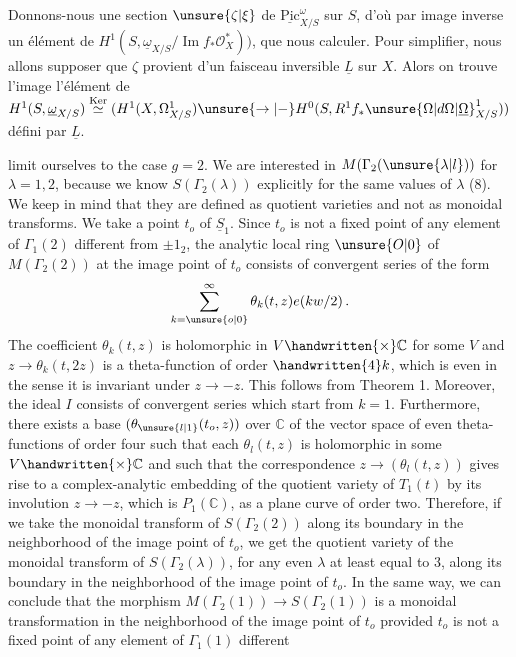 Donnons-nous une section  $\unsure{\zeta|\xi}$ de $\underline{\mathrm{Pic}}_{X/S}^{\omega}$ sur $S$, d'où par image inverse un élément de $H^{1}(S,\underline{\omega}_{X/S}/\operatorname{Im}f_{*}\mathcal{O}_{X}^{*}))$, que nous  calculer. Pour simplifier, nous allons supposer que $\zeta$ provient d'un faisceau inversible $\underline{L}$ sur $X$. Alors on trouve l'image  l'élément de $H^{1}(S,\underline{\omega}_{X/S})\overset{\mathrm{Ker}}{\simeq}(H^{1}(X,\Omega^{1}_{X/S})\unsure{\to|-}H^{0}(S,R^{1}f_{*}\unsure{\Omega|d\Omega|\underline{\Omega}}^{1}_{X/S}))$ défini par $\underline{L}$.



limit ourselves to the case $g=2$. We are interested in $M(\Gamma_{2}(\unsure{\lambda|l}))$ for $\lambda=1,2$, because we know $S(\Gamma_{2}(\lambda))$ explicitly for the same values of $\lambda$ (8). We keep in mind that they are defined as quotient varieties and not as monoidal transforms. We take a point $t_{o}$ of $\underline{S}_{1}$. Since $t_{o}$ is not a fixed point of any element of $\Gamma_{1}(2)$ different from $\pm1_{2}$, the analytic local ring $\unsure{O|0}$ of $M(\Gamma_{2}(2))$ at the image point of $t_{o}$ consists of convergent series of the form
\[
\sum_{k=\unsure{o|0}}^{\infty}\theta_{k}(t,z)e(kw/2)\,.
\]
The coefficient $\theta_{k}(t,z)$ is holomorphic in $V\handwritten{\times}\mathbb{C}$ for some $V$ and $z\longrightarrow\theta_{k}(t,2z)$ is a theta-function of order $\handwritten{4}k$, which is even in the sense it is invariant under $z\longrightarrow-z$. This follows from Theorem 1. Moreover, the ideal $I$ consists of convergent series which start from $k=1$. Furthermore, there exists a base $(\theta_{\unsure{l|1}}(t_{o},z))$ over $\mathbb{C}$ of the vector space of even theta-functions of order four such that each $\theta_{l}(t,z)$ is holomorphic in some $V\handwritten{\times}\mathbb{C}$ and such that the correspondence $z\longrightarrow(\theta_{l}(t,z))$ gives rise to a complex-analytic embedding of the quotient variety of $T_{1}(t)$ by its involution $z\longrightarrow-z$, which is $P_{1}(\mathbb{C})$, as a plane curve of order two. Therefore, if we take the monoidal transform of $S(\Gamma_{2}(2))$ along its boundary in the neighborhood of the image point of $t_{o}$, we get the quotient variety of the monoidal transform of $S(\Gamma_{2}(\lambda))$, for any even $\lambda$ at least equal to 3, along its boundary in the neighborhood of the image point of $t_{o}$. In the same way, we can conclude that the morphism $M(\Gamma_{2}(1))\longrightarrow S(\Gamma_{2}(1))$ is a monoidal transformation in the neighborhood of the image point of $t_{o}$ provided $t_{o}$ is not a fixed point of any element of $\Gamma_{1}(1)$ different


